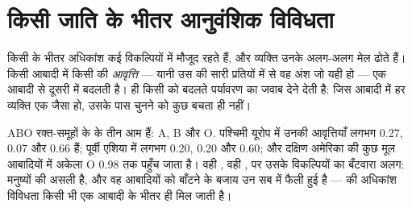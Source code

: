 \section{किसी जाति के भीतर आनुवंशिक विविधता}

\begin{proposition}[किसी जाति के व्यक्ति एक जैसे नहीं होते]\label{prop:g10:biodiversity-scales:genetic}
किसी  के भीतर अधिकांश  कई विकल्पियों में मौजूद रहते हैं, और
व्यक्ति उनके अलग-अलग मेल ढोते हैं। किसी आबादी में किसी  की
\emph{आवृत्ति} --- यानी उस  की सारी प्रतियों में से वह अंश जो यही
 हो --- एक आबादी से दूसरी में बदलती है।  ही किसी
 को बदलते पर्यावरण का जवाब देने देती है: जिस आबादी में हर व्यक्ति
एक जैसा हो, उसके पास चुनने को कुछ बचता ही नहीं।
\end{proposition}
\admitted

\begin{example}[दुनिया भर में रक्त-समूह के युग्मविकल्पी]\label{ex:g10:biodiversity-scales:abo}
ABO रक्त-समूहों के  के तीन आम  हैं: A, B और O. पश्चिमी यूरोप में
उनकी आवृत्तियाँ लगभग 0.27, 0.07 और 0.66 हैं; पूर्वी एशिया में लगभग 0.20,
0.20 और 0.60; और दक्षिण अमेरिका की कुछ मूल आबादियों में अकेला O 
0.98 तक पहुँच जाता है। वही , वही , पर उसके विकल्पियों का बँटवारा
अलग: मनुष्यों की  असली है, और वह आबादियों को बाँटने के
बजाय उन सब में फैली हुई है ---  की अधिकांश विविधता किसी भी एक
आबादी के भीतर ही मिल जाती है।
\end{example}

